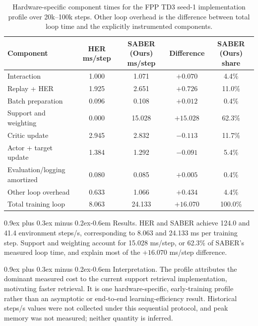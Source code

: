 \documentclass[10pt,letterpaper]{article}
\makeatletter
\renewcommand\paragraph{\@startsection{paragraph}{4}{0pt}%
  {0.9ex plus 0.3ex minus 0.2ex}{-0.6em}%
  {\normalfont\normalsize\bfseries}}
\renewenvironment{table*}[1][tbp]
  {\begin{table}[!htbp]}
  {\end{table}}
\makeatother
\begin{document}

\begin{table}[t]
\centering
\small
\setlength{\tabcolsep}{7pt}
\begin{tabular}{lcccc}
\toprule
Component & HER ms/step & SABER (Ours) ms/step & Difference & SABER (Ours) share \\
\midrule
Interaction & 1.000 & 1.071 & \(+0.070\) & 4.4\% \\
Replay + HER & 1.925 & 2.651 & \(+0.726\) & 11.0\% \\
Batch preparation & 0.096 & 0.108 & \(+0.012\) & 0.4\% \\
Support and weighting & 0.000 & 15.028 & \(+15.028\) & 62.3\% \\
Critic update & 2.945 & 2.832 & \(-0.113\) & 11.7\% \\
Actor + target update & 1.384 & 1.292 & \(-0.091\) & 5.4\% \\
Evaluation/logging amortized & 0.080 & 0.085 & \(+0.005\) & 0.4\% \\
Other loop overhead & 0.633 & 1.066 & \(+0.434\) & 4.4\% \\
\midrule
Total training loop & 8.063 & 24.133 & \(+16.070\) & 100.0\% \\
\bottomrule
\end{tabular}
\caption{Hardware-specific component times for the FPP TD3 seed-1
implementation profile over 20k--100k steps. Other loop overhead is the
difference between total loop time and the explicitly instrumented components.}
\label{tab:supp-runtime-components}
\end{table}

\paragraph{Results.}
HER and SABER achieve 124.0 and 41.4 environment steps/s, corresponding to
8.063 and 24.133 ms per training step. Support and weighting account for
15.028 ms/step, or 62.3\% of SABER's measured loop time, and explain most of
the \(+16.070\) ms/step difference.

\paragraph{Interpretation.}
The profile attributes the dominant measured cost to the current support
retrieval implementation, motivating faster retrieval. It is one
hardware-specific, early-training profile rather than an asymptotic or
end-to-end learning-efficiency result. Historical steps/s values were not
collected under this sequential protocol, and peak memory was not measured;
neither quantity is inferred.
\end{document}
